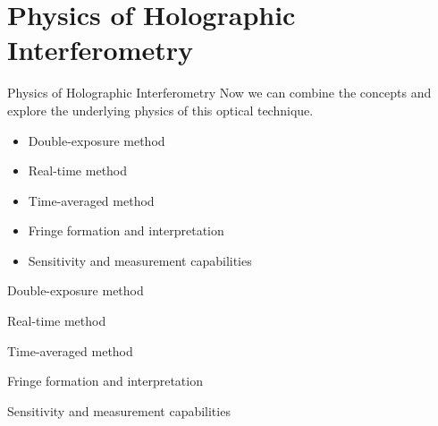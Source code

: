 \documentclass{beamer}
\begin{document}
\section{Physics of Holographic Interferometry}
\begin{frame}{Physics of Holographic Interferometry}
    Now we can combine the concepts and explore the underlying physics of this optical technique.
    \begin{itemize}
        \item Double-exposure method
        \item Real-time method
        \item Time-averaged method
        \item Fringe formation and interpretation
        \item Sensitivity and measurement capabilities
    \end{itemize}
\end{frame}
\begin{frame}{Double-exposure method}

\end{frame}
\begin{frame}{Real-time method}

\end{frame}
\begin{frame}{Time-averaged method}

\end{frame}
\begin{frame}{Fringe formation and interpretation}

\end{frame}
\begin{frame}{Sensitivity and measurement capabilities}

\end{frame}
\end{document}
